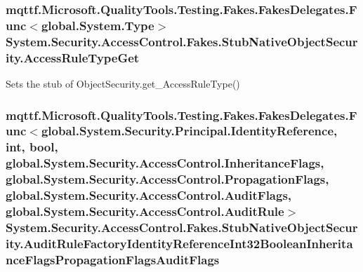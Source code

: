 \hypertarget{class_system_1_1_security_1_1_access_control_1_1_fakes_1_1_stub_native_object_security_a4b4486760f203bc3f4e298b945c30b80}{
\subsubsection[{Access\-Rule\-Type\-Get}]{\setlength{\rightskip}{0pt plus 5cm}mqttf.\-Microsoft.\-Quality\-Tools.\-Testing.\-Fakes.\-Fakes\-Delegates.\-Func$<$global.\-System.\-Type$>$ System.\-Security.\-Access\-Control.\-Fakes.\-Stub\-Native\-Object\-Security.\-Access\-Rule\-Type\-Get}}\label{class_system_1_1_security_1_1_access_control_1_1_fakes_1_1_stub_native_object_security_a4b4486760f203bc3f4e298b945c30b80}


Sets the stub of Object\-Security.\-get\-\_\-\-Access\-Rule\-Type()

\hypertarget{class_system_1_1_security_1_1_access_control_1_1_fakes_1_1_stub_native_object_security_ab21045b6118b3d60b1973de6c76e7aff}{
\subsubsection[{Audit\-Rule\-Factory\-Identity\-Reference\-Int32\-Boolean\-Inheritance\-Flags\-Propagation\-Flags\-Audit\-Flags}]{\setlength{\rightskip}{0pt plus 5cm}mqttf.\-Microsoft.\-Quality\-Tools.\-Testing.\-Fakes.\-Fakes\-Delegates.\-Func$<$global.\-System.\-Security.\-Principal.\-Identity\-Reference, int, bool, global.\-System.\-Security.\-Access\-Control.\-Inheritance\-Flags, global.\-System.\-Security.\-Access\-Control.\-Propagation\-Flags, global.\-System.\-Security.\-Access\-Control.\-Audit\-Flags, global.\-System.\-Security.\-Access\-Control.\-Audit\-Rule$>$ System.\-Security.\-Access\-Control.\-Fakes.\-Stub\-Native\-Object\-Security.\-Audit\-Rule\-Factory\-Identity\-Reference\-Int32\-Boolean\-Inheritance\-Flags\-Propagation\-Flags\-Audit\-Flags}}\label{class_system_1_1_security_1_1_access_control_1_1_fakes_1_1_stub_native_object_security_ab21045b6118b3d60b1973de6c76e7aff}


